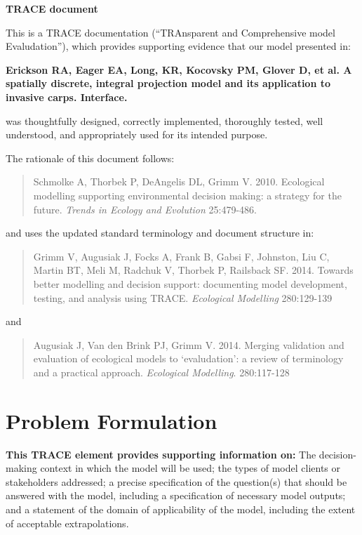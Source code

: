 \documentclass{article}[12pt]
\begin{document}
\begin{center}
\textbf{{\huge TRACE document}}
\end{center}

This is a TRACE documentation (``TRAnsparent and Comprehensive model Evaludation''), 
which provides supporting evidence that our model presented in:
\begin{center}
\textbf{Erickson RA, Eager EA, Long, KR,  Kocovsky PM, Glover D, et al. A spatially discrete, integral projection model and its application to invasive carps. Interface.}
\end{center}
was thoughtfully designed, correctly implemented, thoroughly tested, well understood, and appropriately used for its intended purpose. 

 The rationale of this document follows: 
\begin{verse}
Schmolke A, Thorbek P, DeAngelis DL, Grimm V. 2010. Ecological modelling supporting environmental decision making: a strategy for the future. \textit{Trends in Ecology and Evolution} 25:479-486.
\end{verse}
and uses the updated standard terminology and document structure in:
\begin{verse}
Grimm V, Augusiak J, Focks A, Frank B, Gabsi F, Johnston, Liu C, Martin BT, Meli M, Radchuk V, Thorbek P, Railsback SF. 2014. Towards better modelling and decision support: documenting model development, testing, and analysis using TRACE. \textit{Ecological Modelling} 280:129-139
\end{verse}
and
\begin{verse}
Augusiak J, Van den Brink PJ, Grimm V. 2014. Merging validation and evaluation of ecological models to `evaludation': a review of terminology and a practical approach. \textit{Ecological Modelling}. 280:117-128
\end{verse}


\pagebreak

\tableofcontents

\pagebreak
\section{Problem Formulation}
\textbf{This TRACE element provides supporting information on:} The decision-making context in which the model will be used; the types of model clients or stakeholders addressed; a precise specification of the question(s) that should be answered with the model, including a specification of necessary model outputs; and a statement of the domain of applicability of the model, including the extent of acceptable extrapolations. 
\end{document}
